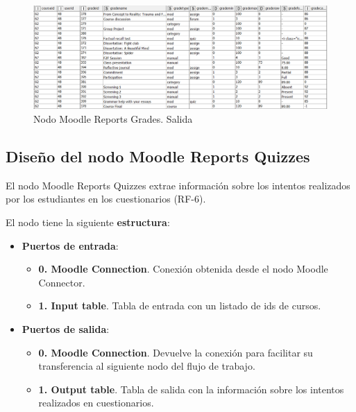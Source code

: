 \begin{figure}[!h]
	\centering
	\includegraphics[width=1\textwidth]{img/nodes_moodle_reports_grades_output.png}
	\caption{Nodo Moodle Reports Grades. Salida}
	\label{fig:moodlereportsgrades_output}
\end{figure}
\FloatBarrier
\hphantom{ }


\newpage
\subsection{Diseño del nodo Moodle Reports Quizzes}

El nodo Moodle Reports Quizzes extrae información sobre los intentos realizados por los estudiantes en los cuestionarios (RF-6). 
\

El nodo tiene la siguiente \textbf{estructura}:

\begin{itemize}
	\item \textbf{Puertos de entrada}: 
    \begin{itemize}
		\item \textbf{0. Moodle Connection}. Conexión obtenida desde el nodo Moodle Connector. 
		\item \textbf{1. Input table}. Tabla de entrada con un listado de ids de cursos. 
   	\end{itemize}

	\item \textbf{Puertos de salida}: 
    \begin{itemize}
		\item \textbf{0. Moodle Connection}. Devuelve la conexión para facilitar su transferencia al siguiente nodo del flujo de trabajo. 
		\item \textbf{1. Output table}. Tabla de salida con la información sobre los intentos realizados en cuestionarios. 
   	\end{itemize}

\end{itemize}


